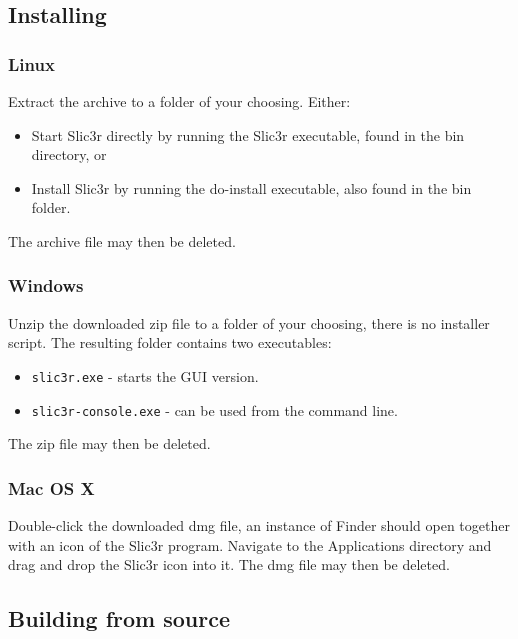 
\subsection{Installing}

\subsubsection{Linux}

Extract the archive to a folder of your choosing.
Either:
\begin{itemize}
\item Start Slic3r directly by running the Slic3r executable, found in the bin directory, or
\item Install Slic3r by running the do-install executable, also found in the bin folder.
\end{itemize}
The archive file may then be deleted.

\subsubsection{Windows}

Unzip the downloaded zip file to a folder of your choosing, there is no installer script. The resulting folder contains two executables:
\begin{itemize}
\item \texttt{slic3r.exe} - starts the GUI version.
\item \texttt{slic3r-console.exe} - can be used from the command line.
\end{itemize}

The zip file may then be deleted.

\subsubsection{Mac OS X}

Double-click the downloaded dmg file, an instance of Finder should open together with an icon of the Slic3r program.  Navigate to the Applications directory and drag and drop the Slic3r icon into it.
The dmg file may then be deleted.



\subsection{Building from source} %
\label{sec:building_from_source}

